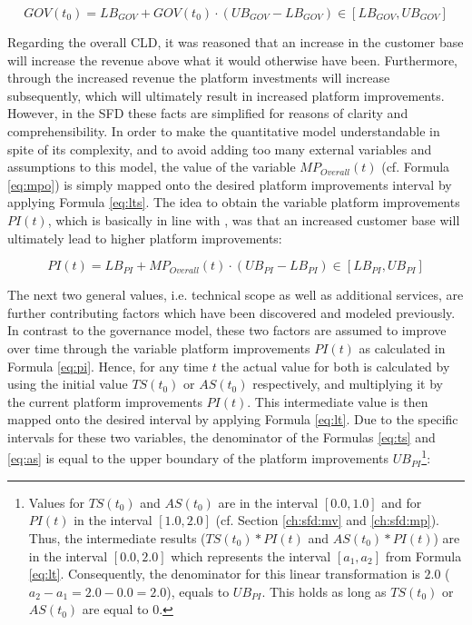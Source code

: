 \begin{equation}\label{eq:gov}
	GOV(t_0) = LB_{GOV} + GOV(t_0) \cdot (UB_{GOV} - LB_{GOV}) \in [LB_{GOV},UB_{GOV}]
\end{equation}

Regarding the overall \ac{CLD}, it was reasoned that an increase in the customer base will increase the revenue above what it would otherwise have been. Furthermore, through the increased revenue the platform investments will increase subsequently, which will ultimately result in increased platform improvements. However, in the \ac{SFD} these facts are simplified for reasons of clarity and comprehensibility. In order to make the quantitative model understandable in spite of its complexity, and to avoid adding too many external variables and assumptions to this model, the value of the variable $MP_{Overall}(t)$ (cf. Formula \ref{eq:mpo}) is simply mapped onto the desired platform improvements interval by applying Formula \ref{eq:lts}. The idea to obtain the variable platform improvements $PI(t)$, which is basically in line with \citet[p. 200]{Evans2003}, was that an increased customer base will ultimately lead to higher platform improvements:

\begin{equation}\label{eq:pi}
	PI(t) = LB_{PI} + MP_{Overall}(t) \cdot (UB_{PI} - LB_{PI}) \in [LB_{PI},UB_{PI}]
\end{equation}

The next two general values, i.e. technical scope as well as additional services, are further contributing factors which have been discovered and modeled previously. In contrast to the governance model, these two factors are assumed to improve over time through the variable platform improvements $PI(t)$ as calculated in Formula \ref{eq:pi}. Hence, for any time $t$ the actual value for both is calculated by using the initial value $TS(t_0)$ or $ AS(t_0)$ respectively, and multiplying it by the current platform improvements $PI(t)$. This intermediate value is then mapped onto the desired interval by applying Formula \ref{eq:lt}. Due to the specific intervals for these two variables, the denominator of the Formulas \ref{eq:ts} and \ref{eq:as} is equal to the upper boundary of the platform improvements $UB_{PI}$\footnote{Values for $TS(t_0)$ and $AS(t_0)$ are in the interval $[0.0,1.0]$ and for $PI(t)$ in the interval $[1.0,2.0]$ (cf. Section \ref{ch:sfd:mv} and \ref{ch:sfd:mp}). Thus, the intermediate results ($TS(t_0)*PI(t)$ and $AS(t_0) *PI(t)$) are in the interval $[0.0,2.0]$ which represents the interval $[a_1,a_2]$ from Formula \ref{eq:lt}. Consequently, the denominator for this linear transformation is $2.0$ ($a_2 - a_1 = 2.0 - 0.0 = 2.0$), equals to $UB_{PI}$. This holds as long as $TS(t_0)$ or $AS(t_0)$ are equal to $0$.}:


